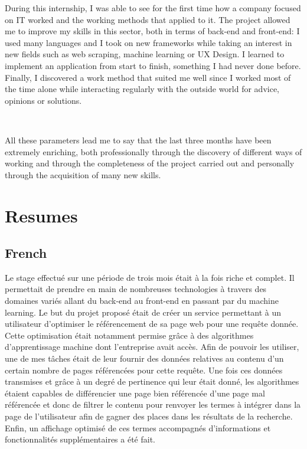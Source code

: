 \documentclass[12pt]{article}
\begin{document}
During this internship, I was able to see for the first time how a company focused on IT worked and the working methods that applied to it. The project allowed me to improve my skills in this sector, both in terms of back-end and front-end: I used many languages and I took on new frameworks while taking an interest in new fields such as web scraping, machine learning or UX Design. I learned to implement an application from start to finish, something I had never done before. Finally, I discovered a work method that suited me well since I worked most of the time alone while interacting regularly with the outside world for advice, opinions or solutions.

\

All these parameters lead me to say that the last three months have been extremely enriching, both professionally through the discovery of different ways of working and through the completeness of the project carried out and personally through the acquisition of many new skills.


\newpage
\section{Resumes}

\subsection{French}

Le stage effectué sur une période de trois mois était à la fois riche et complet. Il permettait de prendre en main de nombreuses technologies à travers des domaines variés allant du back-end au front-end en passant par du machine learning. Le but du projet proposé était de créer un service permettant à un utilisateur d'optimiser le référencement de sa page web pour une requête donnée. Cette optimisation était notamment permise grâce à des algorithmes d'apprentissage machine dont l'entreprise avait accès. Afin de pouvoir les utiliser, une de mes tâches était de leur fournir des données relatives au contenu d'un certain nombre de pages référencées pour cette requête. Une fois ces données transmises et grâce à un degré de pertinence qui leur était donné, les algorithmes étaient capables de différencier une page bien référencée d'une page mal référencée et donc de filtrer le contenu pour renvoyer les termes à intégrer dans la page de l'utilisateur afin de gagner des places dans les résultats de la recherche. Enfin, un affichage optimisé de ces termes accompagnés d'informations et fonctionnalités supplémentaires a été fait.
\end{document}
